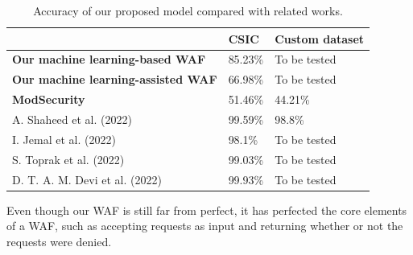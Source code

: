 \begin{table}[ht]
\centering
	\begin{tabular}{lll} 
	\hline
										  & \textbf{CSIC}       & \textbf{Custom dataset} \\ \hline
	\textbf{Our machine learning-based WAF} &85.23\% & To be tested \\
	\textbf{Our machine learning-assisted WAF} &66.98\% & To be tested \\
	\textbf{ModSecurity}                &51.46\% &44.21\% \\
	A. Shaheed et al.\cite{Shaheed} (2022)                    & 99.59\%    & 98.8\%         \\
	I. Jemal et al. \cite{Jemal} (2022)                       & 98.1\%     & To be tested     \\
	S. Toprak et al. \cite{Toprak} (2022)                     & 99.03\%    & To be tested     \\
	D. T. A. M. Devi et al. \cite{Devi} (2022)                             & 99.93\%    & To be tested \\ \hline
	\end{tabular}
	\caption{\label{demo-table-8} Accuracy of our proposed model compared with related works.
	}
\end{table} 

Even though our WAF is still far from perfect, it has perfected the core elements of a WAF, such as accepting requests as input and returning whether or not the requests were denied. 

